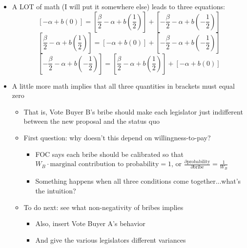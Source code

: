\documentclass[12pt]{article}
\begin{document}
\begin{itemize}
\begin{itemize}
			\item A LOT of math (I will put it somewhere else) leads to three equations:
				\[
				  \left[ - \alpha + b(0) \right] = \left[ \frac{\beta}{2} - \alpha + b\left(\frac{1}{2}\right) \right] + \left[ -\frac{\beta}{2} - \alpha + b\left(-\frac{1}{2}\right) \right]
				\]
				\[
				   \left[ \frac{\beta}{2} - \alpha + b\left(\frac{1}{2}\right) \right] =\left[ - \alpha + b(0) \right]+ \left[ -\frac{\beta}{2} - \alpha + b\left(-\frac{1}{2}\right) \right]
				\]
				\[
				   \left[ -\frac{\beta}{2} - \alpha + b\left(-\frac{1}{2}\right) \right] = \left[ \frac{\beta}{2} - \alpha + b\left(\frac{1}{2}\right) \right] +\left[ - \alpha + b(0) \right]
				\]
			\item A little more math implies that all three quantities in brackets must equal zero
				\begin{itemize}
					\item That is, Vote Buyer B's bribe should make each legislator just indifferent between the new proposal and the status quo
					\item First question: why doesn't this depend on willingness-to-pay?
						\begin{itemize}
							\item FOC says each bribe should be calibrated so that $W_B \cdot \text{marginal contribution to probability} = 1$, or $\frac{\partial \text{probability}}{\partial \text{bribe}} = \frac{1}{W_B}$
							\item Something happens when all three conditions come together...what's the intuition?
						\end{itemize}
					\item To do next: see what non-negativity of bribes implies
						\begin{itemize}
							\item Also, insert Vote Buyer A's behavior
							\item And give the various legislators different variances
						\end{itemize}
				\end{itemize}
		\end{itemize}
\end{itemize}
\end{document}
